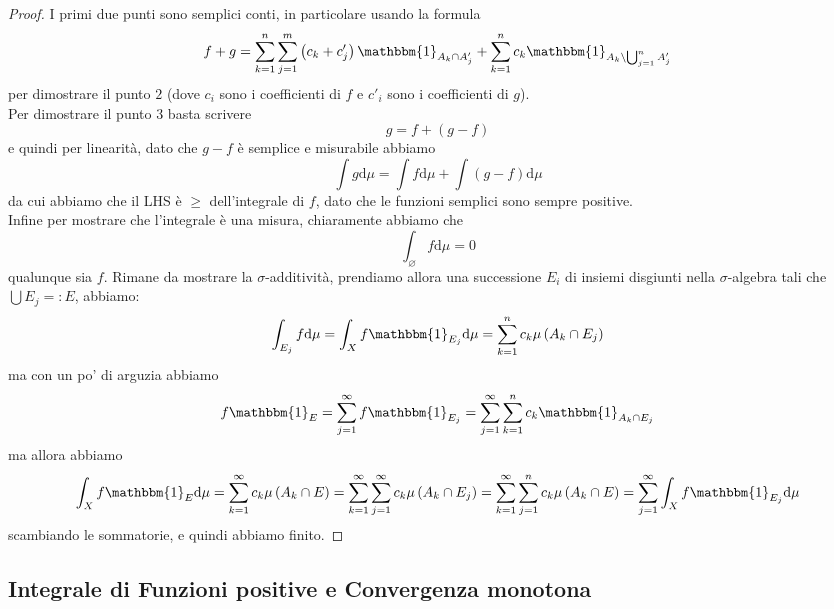 \documentclass[11pt]{scrartcl}
\newcommand{\dif}{\text{d}}
\newcommand{\eset}{\varnothing}
\begin{document}
	\begin{proof}
		I primi due punti sono semplici conti, in particolare usando la formula
		$$f+g=\sum_{k=1}^{n}\sum_{j=1}^{m}\left(c_k+c_j'\right)\mathbbm{1}_{A_k\cap A_j'}+\sum_{k=1}^{n}c_k \mathbbm{1}_{A_k\setminus \bigcup_{j=1}^n A_j'}$$
		per dimostrare il punto $2$ (dove $c_i$ sono i coefficienti di $f$ e $c'_i$ sono i coefficienti di $g$). \\
		Per dimostrare il punto $3$ basta scrivere
		$$g=f+\left(g-f\right)$$
		e quindi per linearità, dato che $g-f$ è semplice e misurabile abbiamo
		$$\int g \dif \mu = \int f \dif \mu +\int \left(g-f\right)\dif \mu$$
		da cui abbiamo che il LHS è $\ge$ dell'integrale di $f$, dato che le funzioni semplici sono sempre positive. \\
		Infine per mostrare che l'integrale è una misura, chiaramente abbiamo che
		$$\int_\eset f \dif \mu =0$$
		qualunque sia $f$. Rimane da mostrare la $\sigma$-additività, prendiamo allora una successione $E_i$ di insiemi disgiunti nella $\sigma$-algebra tali che $\bigcup E_j =: E$, abbiamo:
		$$\int_{E_j}f\dif \mu=\int_X f\mathbbm{1}_{E_j}\dif \mu=\sum_{k=1}^{n}c_k\mu\left(A_k\cap E_j\right)$$
		ma con un po' di arguzia abbiamo
		$$f\mathbbm{1}_E=\sum_{j=1}^{\infty}f\mathbbm{1}_{E_j}=\sum_{j=1}^{\infty}\sum_{k=1}^{n}c_k\mathbbm{1}_{A_k\cap E_j}$$
		ma allora abbiamo
		$$\int_X f \mathbbm{1}_E\dif \mu =\sum_{k=1}^{\infty}c_k \mu\left(A_k\cap E\right)=\sum_{k=1}^{\infty}\sum_{j=1}^{\infty}c_k \mu\left(A_k\cap E_j\right)=\sum_{k=1}^{\infty}\sum_{j=1}^{n}c_k \mu\left(A_k\cap E\right)=\sum_{j=1}^{\infty}\int_X f \mathbbm{1}_{E_j}\dif \mu $$
		scambiando le sommatorie, e quindi abbiamo finito.
	\end{proof}
	
	\subsection{Integrale di Funzioni positive e Convergenza monotona}
	
\end{document}
